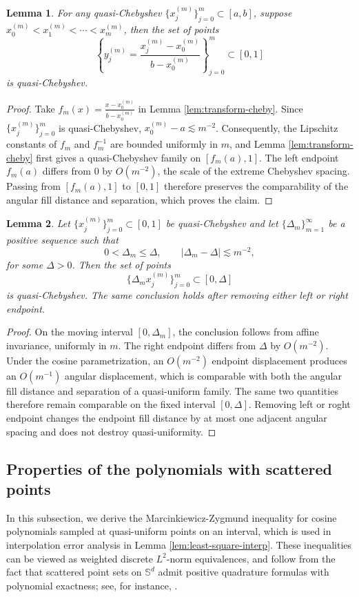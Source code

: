 \documentclass{article}
\numberwithin{equation}{section}
\newtheorem{lemma}{Lemma}
\def\lt{\left}
\def\rt{\right}
\begin{document}
\begin{lemma}\label{lem:rescale-cheby}
    For any quasi-Chebyshev $\{x_j^{(m)}\}_{j=0}^m\subset [a,b]$, suppose $x_0^{(m)}<x_1^{(m)}<\cdots <x_m^{(m)}$, then the set of points $$ \lt\{y_j^{(m)} = \frac{x_j^{(m)}-x_0^{(m)}}{b-x_0^{(m)}}\rt\}_{j=0}^m\subset [0,1]$$
    is quasi-Chebyshev.
\end{lemma}
\begin{proof}
    Take $f_m(x)=\frac{x-x_0^{(m)}}{b-x_0^{(m)}}$ in Lemma \ref{lem:transform-cheby}. Since $\{x_j^{(m)}\}_{j=0}^m$ is quasi-Chebyshev, $x_0^{(m)}-a\lesssim m^{-2}$. Consequently, the Lipschitz constants of $f_m$ and $f_m^{-1}$ are bounded uniformly in $m$, and Lemma \ref{lem:transform-cheby} first gives a quasi-Chebyshev family on $[f_m(a),1]$. The left endpoint $f_m(a)$ differs from $0$ by $O(m^{-2})$, the scale of the extreme Chebyshev spacing. Passing from $[f_m(a),1]$ to $[0,1]$ therefore preserves the comparability of the angular fill distance and separation, which proves the claim.
\end{proof}

\begin{lemma}\label{lem:limit-cheby}
    Let $\{x_j^{(m)}\}_{j=0}^m\subset [0,1]$ be quasi-Chebyshev and let $\{\Delta_m\}_{m=1}^\infty$ be a positive sequence such that
    $$0<\Delta_m\leq\Delta,\qquad |\Delta_m-\Delta|\lesssim m^{-2},$$
    for some $\Delta>0$. Then the set of points
    $$ \{\Delta_m x_j^{(m)}\}_{j=0}^m \subset [0,\Delta]$$
    is quasi-Chebyshev. The same conclusion holds after removing either left or right endpoint.
\end{lemma}
\begin{proof}
    On the moving interval $[0,\Delta_m]$, the conclusion follows from affine invariance, uniformly in $m$. The right endpoint differs from $\Delta$ by $O(m^{-2})$. Under the cosine parametrization, an $O(m^{-2})$ endpoint displacement produces an $O(m^{-1})$ angular displacement, which is comparable with both the angular fill distance and separation of a quasi-uniform family. The same two quantities therefore remain comparable on the fixed interval $[0,\Delta]$. Removing left or roght endpoint changes the endpoint fill distance by at most one adjacent angular spacing and does not destroy quasi-uniformity.
\end{proof}

\subsection{Properties of the polynomials with scattered points}\label{subsec:prop_scatter}
In this subsection, we derive the Marcinkiewicz-Zygmund inequality for cosine polynomials sampled at quasi-uniform points on an interval, which is used in interpolation error analysis in Lemma \ref{lem:least-square-interp}. These inequalities can be viewed as weighted discrete $L^2$-norm equivalences, and follow from the fact that scattered point sets on $\mathbb S^d$ admit positive quadrature formulas with polynomial exactness; see, for instance, \cite{mhaskar2001spherical,bondarenko2013optimal,jetter2023norming}.
 
\end{document}
